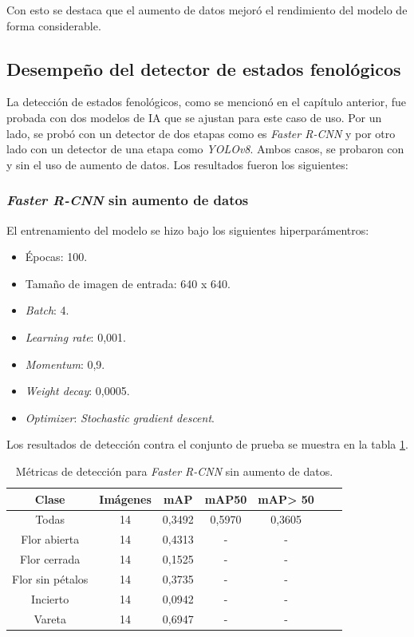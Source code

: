 Con esto se destaca que el aumento de datos mejoró el rendimiento del modelo de forma considerable.

\subsection{Desempeño del detector de estados fenológicos}

La detección de estados fenológicos, como se mencionó en el capítulo anterior, fue probada con dos modelos de IA que se ajustan para este caso de uso. Por un lado, se probó con un detector de dos etapas como es \textit{Faster R-CNN} y por otro lado con un detector de una etapa como \textit{YOLOv8}. Ambos casos, se probaron con y sin el uso de aumento de datos. Los resultados fueron los siguientes:

\subsubsection{\textit{Faster R-CNN} sin aumento de datos}

El entrenamiento del modelo se hizo bajo los siguientes hiperparámentros:

\begin{itemize}
	\item Épocas: 100.
    \item Tamaño de imagen de entrada: 640 x 640.
    \item \textit{Batch}: 4.
    \item \textit{Learning rate}: 0,001.
    \item \textit{Momentum}: 0,9.
    \item \textit{Weight decay}: 0,0005.
    \item \textit{Optimizer}: \textit{Stochastic gradient descent}.
\end{itemize}

Los resultados de detección contra el conjunto de prueba se muestra en la tabla \ref{tab:resultadosFasterSinAug}.

\begin{table}[h]
	\centering
	\caption{Métricas de detección para \textit{Faster R-CNN} sin aumento de datos.}
	\begin{tabular}{c c c c c c c}    
		\toprule
		\textbf{Clase}&\textbf{Imágenes}&\textbf{mAP}&\textbf{mAP50}&\textbf{mAP> 50}\\
		\midrule
		Todas & 14 & 0,3492 & 0,5970 & 0,3605\\
		Flor abierta & 14 & 0,4313 & - & - \\
		Flor cerrada & 14 & 0,1525 & - & - \\
		Flor sin pétalos & 14 & 0,3735 & - & - \\
		Incierto & 14 & 0,0942 & - & - \\
		Vareta & 14 & 0,6947 & - & - \\		
		\bottomrule
		\hline
	\end{tabular}
	\label{tab:resultadosFasterSinAug}
\end{table}

